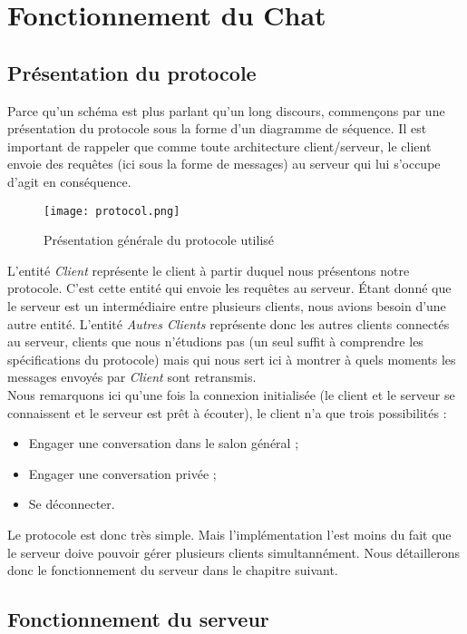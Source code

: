 \chapter{Fonctionnement du Chat}
	
	\section{Présentation du protocole}
		Parce qu'un schéma est plus parlant qu'un long discours, commençons par une présentation du protocole sous la forme d'un diagramme de séquence. Il est important de rappeler que comme toute architecture client/serveur, le client envoie des requêtes (ici sous la forme de messages) au serveur qui lui s'occupe d'agit en conséquence.
		\begin{figure}[h!]
			\centering
			\texttt{[image: protocol.png]}
			\caption{Présentation générale du protocole utilisé}
		\end{figure}
		\FloatBarrier
		
		L'entité \emph{Client} représente le client à partir duquel nous présentons notre protocole. C'est cette entité qui envoie les requêtes au serveur. Étant donné que le serveur est un intermédiaire entre plusieurs clients, nous avions besoin d'une autre entité. L'entité \emph{Autres Clients} représente donc les autres clients connectés au serveur, clients que nous n'étudions pas (un seul suffit à comprendre les spécifications du protocole) mais qui nous sert ici à montrer à quels moments les messages envoyés par \emph{Client} sont retransmis.\\
		
		Nous remarquons ici qu'une fois la connexion initialisée (le client et le serveur se connaissent et le serveur est prêt à écouter), le client n'a que trois possibilités :
		\begin{itemize}
			\item Engager une conversation dans le salon général ;
			\item Engager une conversation privée ;
			\item Se déconnecter.
		\end{itemize}
		
		Le protocole est donc très simple. Mais l'implémentation l'est moins du fait que le serveur doive pouvoir gérer plusieurs clients simultannément. Nous détaillerons donc le fonctionnement du serveur dans le chapitre suivant.
		
	
	\section{Fonctionnement du serveur}
		
